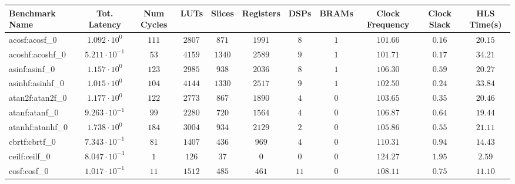 \begin{tabular}{|l|c|c|c|c|c|c|c|c|c|c|}
\hline
Benchmark Name               & Tot. Latency            & Num Cycles & LUTs      & Slices    & Registers & DSPs    & BRAMs & Clock Frequency & Clock Slack & HLS Time(s) \\
\hline
acosf:acosf\_0               & $ 1.092 \cdot 10^{0}  $ & $ 111    $ & $ 2807  $ & $ 871   $ & $ 1991  $ & $ 8   $ & $ 1 $ & $ 101.66      $ & $ 0.16    $ & $ 20.15   $ \\
acoshf:acoshf\_0             & $ 5.211 \cdot 10^{-1} $ & $ 53     $ & $ 4159  $ & $ 1340  $ & $ 2589  $ & $ 9   $ & $ 1 $ & $ 101.71      $ & $ 0.17    $ & $ 34.21   $ \\
asinf:asinf\_0               & $ 1.157 \cdot 10^{0}  $ & $ 123    $ & $ 2985  $ & $ 938   $ & $ 2036  $ & $ 8   $ & $ 1 $ & $ 106.30      $ & $ 0.59    $ & $ 20.27   $ \\
asinhf:asinhf\_0             & $ 1.015 \cdot 10^{0}  $ & $ 104    $ & $ 4144  $ & $ 1330  $ & $ 2517  $ & $ 9   $ & $ 1 $ & $ 102.50      $ & $ 0.24    $ & $ 33.84   $ \\
atan2f:atan2f\_0             & $ 1.177 \cdot 10^{0}  $ & $ 122    $ & $ 2773  $ & $ 867   $ & $ 1890  $ & $ 4   $ & $ 0 $ & $ 103.65      $ & $ 0.35    $ & $ 20.46   $ \\
atanf:atanf\_0               & $ 9.263 \cdot 10^{-1} $ & $ 99     $ & $ 2280  $ & $ 720   $ & $ 1564  $ & $ 4   $ & $ 0 $ & $ 106.87      $ & $ 0.64    $ & $ 19.44   $ \\
atanhf:atanhf\_0             & $ 1.738 \cdot 10^{0}  $ & $ 184    $ & $ 3004  $ & $ 934   $ & $ 2129  $ & $ 2   $ & $ 0 $ & $ 105.86      $ & $ 0.55    $ & $ 21.11   $ \\
cbrtf:cbrtf\_0               & $ 7.343 \cdot 10^{-1} $ & $ 81     $ & $ 1407  $ & $ 436   $ & $ 969   $ & $ 4   $ & $ 0 $ & $ 110.31      $ & $ 0.94    $ & $ 14.43   $ \\
ceilf:ceilf\_0               & $ 8.047 \cdot 10^{-3} $ & $ 1      $ & $ 126   $ & $ 37    $ & $ 0     $ & $ 0   $ & $ 0 $ & $ 124.27      $ & $ 1.95    $ & $ 2.59    $ \\
cosf:cosf\_0                 & $ 1.017 \cdot 10^{-1} $ & $ 11     $ & $ 1512  $ & $ 485   $ & $ 461   $ & $ 11  $ & $ 0 $ & $ 108.11      $ & $ 0.75    $ & $ 11.10   $ \\

\end{tabular}
